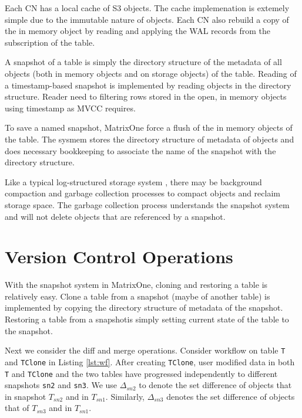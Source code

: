 \documentclass[sigconf,nonacm]{acmart} %
\begin{document}
Each CN has a local cache of S3 objects.  The cache implemenation 
is extemely simple due to the immutable nature of objects.  Each CN
also rebuild a copy of the in memory object by reading
and applying the WAL records from the subscription of the table.

A snapshot of a table is simply the directory structure of 
the metadata of all objects (both in memory objects and 
on storage objects) of the table.  Reading of a timestamp-based 
snapshot is implemented by reading objects in the directory 
structure.  Reader need to filtering rows stored in the 
open, in memory objects using timestamp as MVCC requires.

To save a named snapshot, MatrixOne force a flush of the 
in memory objects of the table.  The sysmem stores the directory 
structure of metadata of objects and does necessary bookkeeping 
to associate the name of the snapshot with the directory structure.

Like a typical log-structured storage 
system \cite{LSMTree}\cite{LSFS}, there may 
be background compaction and garbage collection processes
to compact objects and reclaim storage space.  The garbage 
collection process understands the snapshot system and will 
not delete objects that are referenced by a snapshot.

\section{Version Control Operations}
With the snapshot system in MatrixOne, cloning and restoring a table 
is relatively easy. Clone a table from a snapshot (maybe of another table) 
is implemented by copying the directory structure of metadata of 
the snapshot. Restoring a table from a snapshotis simply setting 
current state of the table to the snapshot.

Next we consider the diff and merge operations.  
Consider workflow on table \texttt{T} and \texttt{TClone} in Listing 
\ref{lst:wf}.   After creating \texttt{TClone}, user modified 
data in both \texttt{T} and \texttt{TClone} and the two tables 
have progressed independently to different snapshots 
\texttt{sn2} and \texttt{sn3}.  We use $\Delta_{sn2}$ to denote 
the set difference of objects that in snapshot $T_{sn2}$ and in $T_{sn1}$. 
Similarly, $\Delta_{sn3}$ denotes the set difference of objects that of
$T_{sn3}$ and in $T_{sn1}$.
\end{document}
